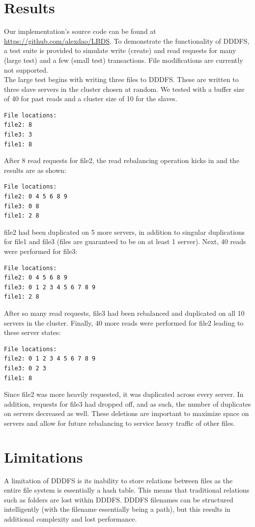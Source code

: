 \documentclass[twoside]{article}
\begin{document}
\begin{multicols}{2}
\section{Results}
Our implementation's source code can be found at \href{https://github.com/alexdao/LBDS}{https://github.com/alexdao/LBDS}. To demonstrate the functionality of DDDFS, a test suite is provided to simulate write (create) and read requests for many (large test) and a few (small test) transactions. File modifications are currently not supported. \\\indent
The large test begins with writing three files to DDDFS. These are written to three slave servers in the cluster chosen at random. We tested with a buffer size of 40 for past reads and a cluster size of 10 for the slaves.
\begin{verbatim}
File locations: 
file2: 8 
file3: 3 
file1: 8 
\end{verbatim}
After 8 read requests for file2, the read rebalancing operation kicks in and the results are as shown:
\begin{verbatim}
File locations: 
file2: 0 4 5 6 8 9 
file3: 0 8 
file1: 2 8 
\end{verbatim}
file2 had been duplicated on 5 more servers, in addition to singular duplications for file1 and file3 (files are guaranteed to be on at least 1 server). Next, 40 reads were performed for file3:
\begin{verbatim}
File locations: 
file2: 0 4 5 6 8 9 
file3: 0 1 2 3 4 5 6 7 8 9 
file1: 2 8 
\end{verbatim}
After so many read requests, file3 had been rebalanced and duplicated on all 10 servers in the cluster. Finally, 40 more reads were performed for file2 leading to these server states:
\begin{verbatim}
File locations: 
file2: 0 1 2 3 4 5 6 7 8 9 
file3: 0 2 3 
file1: 8 
\end{verbatim}
Since file2 was more heavily requested, it was duplicated across every server. In addition, requests for file3 had dropped off, and as such, the number of duplicates on servers decreased as well. These deletions are important to maximize space on servers and allow for future rebalancing to service heavy traffic of other files.

\section{Limitations}
A limitation of DDDFS is its inability to store relations between files as the entire file system is essentially a hash table. This means that traditional relations such as folders are lost within DDDFS. DDDFS filenames can be structured intelligently (with the filename essentially being a path), but this results in additional complexity and lost performance. 


\end{multicols}
\end{document}
